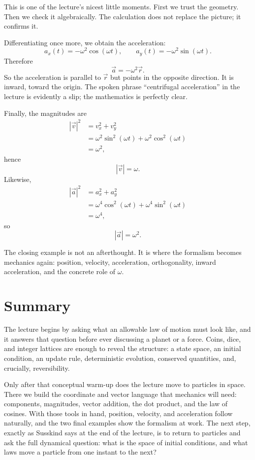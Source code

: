 This is one of the lecture's nicest little moments. First we trust the geometry. Then we check it algebraically. The calculation does not replace the picture; it confirms it.

Differentiating once more, we obtain the acceleration:
\begin{equation}
a_x(t)=-\omega^2\cos(\omega t),\qquad a_y(t)=-\omega^2\sin(\omega t).
\end{equation}
Therefore
\begin{equation}
\vec a=-\omega^2\vec r.
\end{equation}
So the acceleration is parallel to \(\vec r\) but points in the opposite direction. It is inward, toward the origin. The spoken phrase ``centrifugal acceleration'' in the lecture is evidently a slip; the mathematics is perfectly clear.

Finally, the magnitudes are
\begin{align}
|\vec v|^2
  &= v_x^2+v_y^2 \\
  &= \omega^2\sin^2(\omega t)+\omega^2\cos^2(\omega t) \\
  &= \omega^2,
\end{align}
hence
\[
|\vec v|=\omega.
\]
Likewise,
\begin{align}
|\vec a|^2
  &= a_x^2+a_y^2 \\
  &= \omega^4\cos^2(\omega t)+\omega^4\sin^2(\omega t) \\
  &= \omega^4,
\end{align}
so
\[
|\vec a|=\omega^2.
\]

The closing example is not an afterthought. It is where the formalism becomes mechanics again: position, velocity, acceleration, orthogonality, inward acceleration, and the concrete role of \(\omega\).

\section{Summary}

The lecture begins by asking what an allowable law of motion must look like, and it answers that question before ever discussing a planet or a force. Coins, dice, and integer lattices are enough to reveal the structure: a state space, an initial condition, an update rule, deterministic evolution, conserved quantities, and, crucially, reversibility.

Only after that conceptual warm-up does the lecture move to particles in space. There we build the coordinate and vector language that mechanics will need: components, magnitudes, vector addition, the dot product, and the law of cosines. With those tools in hand, position, velocity, and acceleration follow naturally, and the two final examples show the formalism at work. The next step, exactly as Susskind says at the end of the lecture, is to return to particles and ask the full dynamical question: what is the space of initial conditions, and what laws move a particle from one instant to the next?

